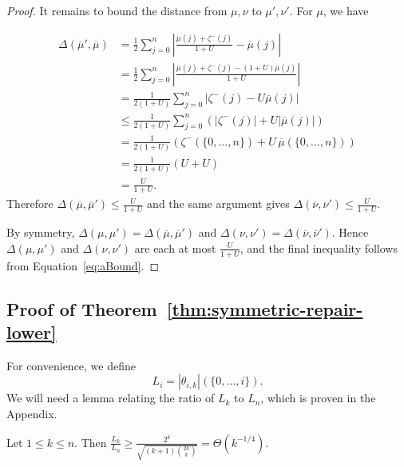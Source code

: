 \documentclass[manuscript,nonacm]{acmart}
\begin{document}
\begin{proof}
It remains to bound the distance from \(\mu,\nu\) to \(\mu',\nu'\).
For \(\mu\), we have


\[
\begin{aligned}
    \Delta(\overline{\mu}',\overline{\mu})
    &=
    \frac12
    \sum_{j=0}^n
    \left|
        \frac{\overline{\mu}(j)+\zeta^-(j)}{1+U}
        -
        \overline{\mu}(j)
    \right|                                                    \\[1ex]
    &=
    \frac12
    \sum_{j=0}^n
    \left|
        \frac{\overline{\mu}(j)+\zeta^-(j)
        -(1+U)\overline{\mu}(j)}{1+U}
    \right|                                                    \\[1ex]
    &=
    \frac{1}{2(1+U)}
    \sum_{j=0}^n
    \left|
        \zeta^-(j)-U\overline{\mu}(j)
    \right|                                                    \\[1ex]
    &\le
    \frac{1}{2(1+U)}
    \sum_{j=0}^n
    \left(
        |\zeta^-(j)|+U|\overline{\mu}(j)|
    \right)                                                    \\[1ex]
    &=
    \frac{1}{2(1+U)}
    \left(
        \zeta^-(\{0,\dots,n\})
        +
        U\,\overline{\mu}(\{0,\dots,n\})
    \right)                                                    \\[1ex]
    &=
    \frac{1}{2(1+U)}(U+U)                                      \\[1ex]
    &=
    \frac{U}{1+U}.
\end{aligned}
\]
Therefore $\Delta(\overline{\mu},\overline{\mu}')\le\frac{U}{1+U}$ and the same argument gives $\Delta(\overline{\nu},\overline{\nu}')\le\frac{U}{1+U}$.

By symmetry, $\Delta(\mu,\mu')=\Delta(\overline{\mu},\overline{\mu}')$ and $\Delta(\nu,\nu')=\Delta(\overline{\nu},\overline{\nu}')$. Hence $\Delta(\mu,\mu')$ and $\Delta(\nu,\nu')$ are each at most $\frac{U}{1+U}$, and the final inequality follows from Equation~\ref{eq:aBound}.
\end{proof}



\subsection{Proof of Theorem~\ref{thm:symmetric-repair-lower}}
For convenience, we define
\[
    L_i=|\theta_{i,k}|(\{0,\dots,i\}).
\]
We will need a lemma relating the ratio of $L_k$ to $L_n$, which is proven in the Appendix.
\begin{lemma}
\label{lem:l1-ratio-simple-lower}
Let \(1\le k\le n\). Then $\frac{L_k}{L_n}\ge\frac{2^k}{\sqrt{(k+1)\binom{2k}{k}}}=\Theta(k^{-1/4})$.
\end{lemma}
\end{document}
